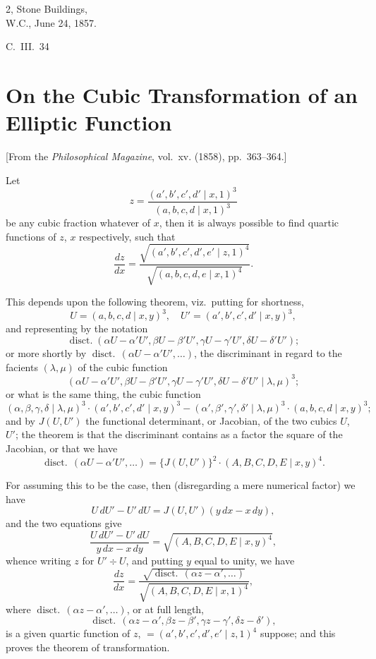 \documentclass[11pt,a4paper]{book}
\begin{document}
\begin{flushright}
2, Stone Buildings,\\
W.C., June 24, 1857.
\end{flushright}
\hfill C.~III.~34
\newpage


\section{On the Cubic Transformation of an Elliptic Function}
\label{sec:210}

[From the \textit{Philosophical Magazine}, vol.~xv. (1858), pp.~363--364.]
\vspace{1em}

Let
\[
z = \frac{(a', b', c', d' \mid x, 1)^3}{(a, b, c, d \mid x, 1)^3}
\]
be any cubic fraction whatever of $x$, then it is always possible to find quartic functions of $z$, $x$ respectively, such that
\[
\frac{dz}{dx} = \frac{\sqrt{(a', b', c', d', e' \mid z, 1)^4}}{\sqrt{(a, b, c, d, e \mid x, 1)^4}}.
\]

This depends upon the following theorem, viz.\ putting for shortness,
\[
U = (a, b, c, d \mid x, y)^3, \quad U' = (a', b', c', d' \mid x, y)^3,
\]
and representing by the notation
\[
\operatorname{disct.} (\alpha U - \alpha' U', \beta U - \beta' U', \gamma U - \gamma' U', \delta U - \delta' U');
\]
or more shortly by $\operatorname{disct.}\,(\alpha U - \alpha' U', \ldots)$, the discriminant in regard to the facients $(\lambda, \mu)$ of the cubic function
\[
(\alpha U - \alpha' U', \beta U - \beta' U', \gamma U - \gamma' U', \delta U - \delta' U' \mid \lambda, \mu)^3;
\]
or what is the same thing, the cubic function
\[
(\alpha, \beta, \gamma, \delta \mid \lambda, \mu)^3 \cdot (a', b', c', d' \mid x, y)^3 - (\alpha', \beta', \gamma', \delta' \mid \lambda, \mu)^3 \cdot (a, b, c, d \mid x, y)^3;
\]
and by $J(U, U')$ the functional determinant, or Jacobian, of the two cubics $U$, $U'$; the theorem is that the discriminant contains as a factor the square of the Jacobian, or that we have
\[
\operatorname{disct.}\,(\alpha U - \alpha' U', \ldots) = \{J(U, U')\}^2 \cdot (A, B, C, D, E \mid x, y)^4.
\]

For assuming this to be the case, then (disregarding a mere numerical factor) we have
\[
U\,dU' - U'\,dU = J(U, U')(y\,dx - x\,dy),
\]
and the two equations give
\[
\frac{U\,dU' - U'\,dU}{y\,dx - x\,dy} = \sqrt{(A, B, C, D, E \mid x, y)^4},
\]
whence writing $z$ for $U' \div U$, and putting $y$ equal to unity, we have
\[
\frac{dz}{dx} = \frac{\sqrt{\operatorname{disct.}\,(\alpha z - \alpha', \ldots)}}{\sqrt{(A, B, C, D, E \mid x, 1)^4}},
\]
where $\operatorname{disct.}\,(\alpha z - \alpha', \ldots)$, or at full length,
\[
\operatorname{disct.}\,(\alpha z - \alpha', \beta z - \beta', \gamma z - \gamma', \delta z - \delta'),
\]
is a given quartic function of $z$, $= (a', b', c', d', e' \mid z, 1)^4$ suppose; and this proves the theorem of transformation.
\end{document}
